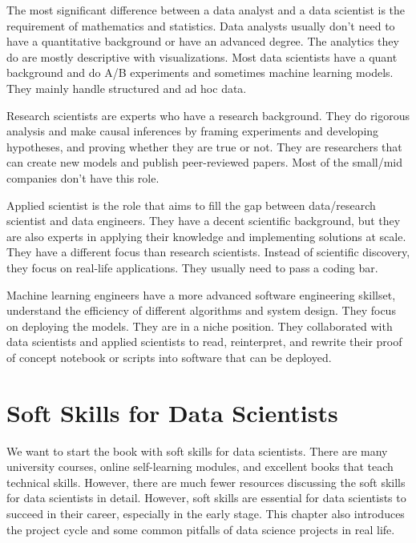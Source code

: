 \documentclass[
  12pt,
]{krantz}
\begin{document}
The most significant difference between a data analyst and a data scientist is the requirement of mathematics and statistics. Data analysts usually don't need to have a quantitative background or have an advanced degree. The analytics they do are mostly descriptive with visualizations. Most data scientists have a quant background and do A/B experiments and sometimes machine learning models. They mainly handle structured and ad hoc data.

Research scientists are experts who have a research background. They do rigorous analysis and make causal inferences by framing experiments and developing hypotheses, and proving whether they are true or not. They are researchers that can create new models and publish peer-reviewed papers. Most of the small/mid companies don't have this role.

Applied scientist is the role that aims to fill the gap between data/research scientist and data engineers. They have a decent scientific background, but they are also experts in applying their knowledge and implementing solutions at scale. They have a different focus than research scientists. Instead of scientific discovery, they focus on real-life applications. They usually need to pass a coding bar.

Machine learning engineers have a more advanced software engineering skillset, understand the efficiency of different algorithms and system design. They focus on deploying the models. They are in a niche position. They collaborated with data scientists and applied scientists to read, reinterpret, and rewrite their proof of concept notebook or scripts into software that can be deployed.

\hypertarget{soft-skills-for-data-scientists}{%
\chapter{Soft Skills for Data Scientists}\label{soft-skills-for-data-scientists}}

We want to start the book with soft skills for data scientists. There are many university courses, online self-learning modules, and excellent books that teach technical skills. However, there are much fewer resources discussing the soft skills for data scientists in detail. However, soft skills are essential for data scientists to succeed in their career, especially in the early stage. This chapter also introduces the project cycle and some common pitfalls of data science projects in real life.
\end{document}
